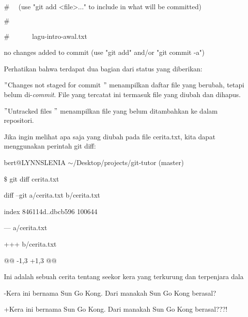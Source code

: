 \noindent 
{\fontsize{10pt}{10pt}\selectfont  $  \#  $~~ (use "git add <file>..." to include in what will be committed)} \par
\noindent 
{\fontsize{10pt}{10pt}\selectfont  $  \#  $} \par
\noindent 
{\fontsize{10pt}{10pt}\selectfont  $  \#  $~~~~~~ lagu-intro-awal.txt} \par
\noindent 
{\fontsize{10pt}{10pt}\selectfont no changes added to commit (use "git add" and/or "git commit -a")} \par
\vspace{12pt}
\noindent 
Perhatikan bahwa terdapat dua bagian dari status yang diberikan: \par
\noindent 
$ " $Changes not staged for commit $ " $ menampilkan daftar file yang berubah, tetapi belum di-\textit{commit}. File yang tercatat ini termasuk file yang diubah dan dihapus. \par
\noindent 
$ " $Untracked files $ " $ menampilkan file yang belum ditambahkan ke dalam repositori.
 \par
\noindent 
Jika ingin melihat apa saja yang diubah pada file {\fontsize{10pt}{10pt}\selectfont cerita.txt, kita dapat menggunakan perintah git diff:} \par
\noindent 
{\fontsize{10pt}{10pt}\selectfont bert@LYNNSLENIA  $  \sim  $/Desktop/projects/git-tutor (master)} \par
\noindent 
{\fontsize{10pt}{10pt}\selectfont  $  \$  $ git diff cerita.txt} \par
\noindent 
{\fontsize{10pt}{10pt}\selectfont diff --git a/cerita.txt b/cerita.txt} \par
\noindent 
{\fontsize{10pt}{10pt}\selectfont index 846114d..dbcb596 100644} \par
\noindent 
{\fontsize{10pt}{10pt}\selectfont --- a/cerita.txt} \par
\noindent 
{\fontsize{10pt}{10pt}\selectfont +++ b/cerita.txt} \par
\noindent 
{\fontsize{10pt}{10pt}\selectfont @@ -1,3 +1,3 @@} \par
\noindent 
{\fontsize{10pt}{10pt}\selectfont  Ini adalah sebuah cerita tentang seekor kera yang terkurung dan terpenjara dala} \par
\noindent 
\vspace{10pt}
\noindent 
{\fontsize{10pt}{10pt}\selectfont -Kera ini bernama Sun Go Kong. Dari manakah Sun Go Kong berasal?} \par
\noindent 
{\fontsize{10pt}{10pt}\selectfont +Kera ini bernama Sun Go Kong. Dari manakah Sun Go Kong berasal???!} \par
